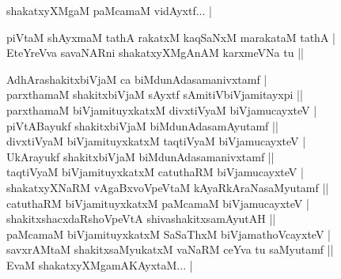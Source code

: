 \begin{entry}
\smallskip
\begin{shl}
shakatxyXMgaM paMcamaM vidAyxtf... |
\end{shl}
\smallskip
{}
\smallskip
\begin{shl}
piVtaM shAyxmaM tathA rakatxM kaqSaNxM marakataM tathA |\\
EteYreVva savaNARni shakatxyXMgAnAM karxmeVNa tu ||
\end{shl}
\smallskip
{}
\smallskip
\begin{shl}
AdhArashakitxbiVjaM ca biMdunAdasamanivxtamf |\\
parxthamaM shakitxbiVjaM sAyxtf sAmitiVbiVjamitayxpi ||\\
parxthamaM biVjamituyxkatxM divxtiVyaM biVjamucayxteV |\\
piVtABayukf shakitxbiVjaM biMdunAdasamAyutamf ||\\
divxtiVyaM biVjamituyxkatxM taqtiVyaM biVjamucayxteV |\\
UkArayukf shakitxbiVjaM biMdunAdasamanivxtamf ||\\
taqtiVyaM biVjamituyxkatxM catuthaRM biVjamucayxteV |\\
shakatxyXNaRM vAgaBxvoVpeVtaM kAyaRkAraNasaMyutamf ||\\
catuthaRM biVjamituyxkatxM paMcamaM biVjamucayxteV |\\
shakitxshacxdaRshoVpeVtA shivashakitxsamAyutAH ||\\
paMcamaM biVjamituyxkatxM SaSaThxM biVjamathoVcayxteV |\\
savxrAMtaM shakitxsaMyukatxM vaNaRM ceYva tu saMyutamf ||\\
EvaM shakatxyXMgamAKAyxtaM... |
\end{shl}
\smallskip
{}
\smallskip
{}
\end{entry}

\begin{entry}
\end{entry}

